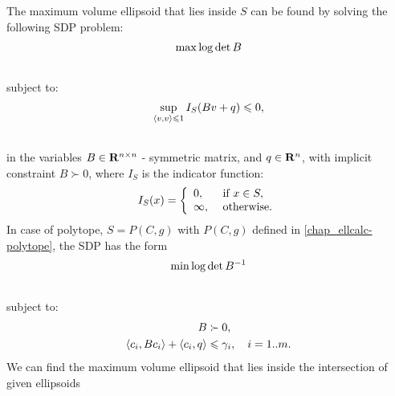 \documentclass[letterpaper,10pt,english]{sphinxmanual}
\begin{document}
The maximum volume ellipsoid that lies inside $S$ can be found by
solving the following SDP problem:
\begin{gather}
\begin{split}\max \log \det B\end{split}\notag\\\begin{split}\end{split}\notag
\end{gather}
subject to:
\begin{gather}
\begin{split}\sup_{\langle v,v\rangle\leqslant1} I_S(Bv+q)\leqslant0 ,\end{split}\notag\\\begin{split}\end{split}\notag
\end{gather}
in the variables $B\in{\bf R}^{n\times n}$ - symmetric matrix,
and $q\in{\bf R}^n$, with implicit constraint $B\succ 0$,
where $I_S$ is the indicator function:
\begin{gather}
\begin{split}I_S(x) = \left\{\begin{array}{ll}
0, & \mbox{ if } x\in S,\\
\infty, & \mbox{ otherwise.}\end{array}\right.\end{split}\notag
\end{gather}
In case of polytope, $S=P(C,g)$ with $P(C,g)$ defined in
\eqref{chap_ellcalc-polytope}, the SDP has the form
\begin{gather}
\begin{split}\min \log \det B^{-1}\end{split}\notag\\\begin{split}\end{split}\notag
\end{gather}
subject to:
\begin{gather}
\begin{split}\begin{aligned}
B & \succ 0,\\
\langle c_i, Bc_i\rangle + \langle c_i, q\rangle & \leqslant \gamma_i,
~~~ i=1..m.\end{aligned}\end{split}\notag
\end{gather}
We can find the maximum volume ellipsoid that lies inside the
intersection of given ellipsoids
\end{document}

